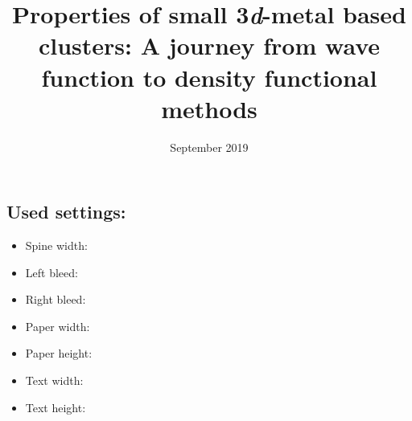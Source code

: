 \documentclass[final,cover,faculty=fw,department=che,phddegree=che]{adsphd}
\title{Properties of small 3\textit{d}-metal based clusters: A journey from wave function to density functional methods}
\author{}{Le Nhan Pham}
\date{September 2019}
\begin{document}
\makefullcoverpage{\adsphdspinewidth}{}

\newlength{\testje}
\setlength{\testje}{10mm}

\mbox{}
\newpage
\subsection*{Used settings:}
\begin{itemize}
	\item Spine width: \printlength{\adsphdspinewidth}
	\item Left bleed: \printlength{\lbleed}
	\item Right bleed: \printlength{\rbleed}
	\item Paper width: \printlength{\adsphdpaperwidth}
	\item Paper height: \printlength{\adsphdpaperheight}
	\item Text width: \printlength{\textwidth}
	\item Text height: \printlength{\textheight}
\end{itemize}
\end{document}
